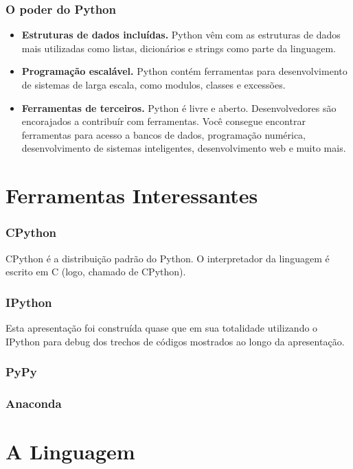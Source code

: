 \documentclass[aspectratio=169]{beamer}
\begin{document}
\begin{frame}
    \frametitle{O poder do Python}
    \begin{itemize}
        \item \textbf{Estruturas de dados incluídas.} Python vêm com as estruturas de
dados mais utilizadas como listas, dicionários e strings como parte da linguagem.
        \item \textbf{Programação escalável.} Python contém ferramentas para desenvolvimento
de sistemas de larga escala, como modulos, classes e excessões.
        \item \textbf{Ferramentas de terceiros.} Python é livre e aberto. Desenvolvedores
são encorajados a contribuír com ferramentas. Você consegue encontrar ferramentas para
acesso a bancos de dados, programação numérica, desenvolvimento de sistemas inteligentes,
desenvolvimento web e muito mais.
    \end{itemize}
\end{frame}


\section{Ferramentas Interessantes}

\begin{frame}
    \frametitle{CPython}
    CPython é a distribuição padrão do Python. O interpretador da linguagem é escrito
em C (logo, chamado de CPython).
\end{frame}

\begin{frame}
    \frametitle{IPython}
    Esta apresentação foi construída quase que em sua totalidade utilizando o IPython para
debug dos trechos de códigos mostrados ao longo da apresentação.
\end{frame}

\begin{frame}
    \frametitle{PyPy}
\end{frame}

\begin{frame}
    \frametitle{Anaconda}
\end{frame}


\section{A Linguagem}
\end{document}
